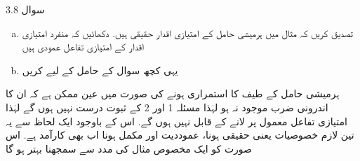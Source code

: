 سوال 3.8
\begin{enumerate}[a.]
\item تصدیق کریں کہ مثال  میں ہرمیشی حامل کے امتیازی اقدار حقیقی ہیں. دکھائیں کہ منفرد امتیازی اقدار کے امتیازی تفاعل عمودی ہیں 
\item یہی کچھ سوال  کے حامل کے لیے کریں 
\end{enumerate}
ہرمیشی حامل کے طیف کا استمراری ہونے کی صورت میں عین ممکن ہے کہ ان کا اندرونی ضرب موجود نہ ہو لہٰذا مسئلہ 1 اور 2  کے ثبوت درست نہیں ہوں گے لہٰذا امتیازی تفاعل معمول پر لانے کے قابل نہیں ہوں گے. اس کے باوجود ایک لحاظ سے یہ تین لازم خصوصیات یعنی حقیقی ہونا، عموددیت اور مکمل ہونا اب بھی کارآمد ہے. اس صورت کو ایک مخصوص مثال کی مدد سے سمجھنا بہتر ہو گا




